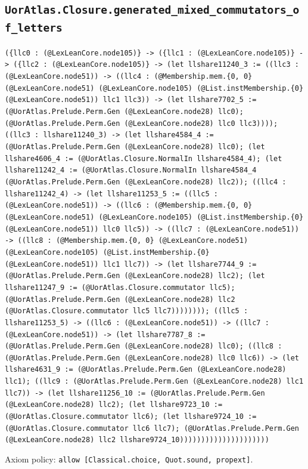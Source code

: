 \documentclass[11pt]{article}
\begin{document}
\subsection*{\texttt{UorAtlas.Closure.generated\_mixed\_commutators\_of\_letters}}
\noindent\texttt{(\{llc0 : (@LexLeanCore.node105)\} -> (\{llc1 : (@LexLeanCore.node105)\} -> (\{llc2 : (@LexLeanCore.node105)\} -> (let llshare11240\_3 := ((llc3 : (@LexLeanCore.node51)) -> ((llc4 : (@Membership.mem.\{0, 0\} (@LexLeanCore.node51) (@LexLeanCore.node105) (@List.instMembership.\{0\} (@LexLeanCore.node51)) llc1 llc3)) -> (let llshare7702\_5 := (@UorAtlas.Prelude.Perm.Gen (@LexLeanCore.node28) llc0); (@UorAtlas.Prelude.Perm.Gen (@LexLeanCore.node28) llc0 llc3)))); ((llc3 : llshare11240\_3) -> (let llshare4584\_4 := (@UorAtlas.Prelude.Perm.Gen (@LexLeanCore.node28) llc0); (let llshare4606\_4 := (@UorAtlas.Closure.NormalIn llshare4584\_4); (let llshare11242\_4 := (@UorAtlas.Closure.NormalIn llshare4584\_4 (@UorAtlas.Prelude.Perm.Gen (@LexLeanCore.node28) llc2)); ((llc4 : llshare11242\_4) -> (let llshare11253\_5 := ((llc5 : (@LexLeanCore.node51)) -> ((llc6 : (@Membership.mem.\{0, 0\} (@LexLeanCore.node51) (@LexLeanCore.node105) (@List.instMembership.\{0\} (@LexLeanCore.node51)) llc0 llc5)) -> ((llc7 : (@LexLeanCore.node51)) -> ((llc8 : (@Membership.mem.\{0, 0\} (@LexLeanCore.node51) (@LexLeanCore.node105) (@List.instMembership.\{0\} (@LexLeanCore.node51)) llc1 llc7)) -> (let llshare7744\_9 := (@UorAtlas.Prelude.Perm.Gen (@LexLeanCore.node28) llc2); (let llshare11247\_9 := (@UorAtlas.Closure.commutator llc5); (@UorAtlas.Prelude.Perm.Gen (@LexLeanCore.node28) llc2 (@UorAtlas.Closure.commutator llc5 llc7)))))))); ((llc5 : llshare11253\_5) -> ((llc6 : (@LexLeanCore.node51)) -> ((llc7 : (@LexLeanCore.node51)) -> (let llshare7787\_8 := (@UorAtlas.Prelude.Perm.Gen (@LexLeanCore.node28) llc0); ((llc8 : (@UorAtlas.Prelude.Perm.Gen (@LexLeanCore.node28) llc0 llc6)) -> (let llshare4631\_9 := (@UorAtlas.Prelude.Perm.Gen (@LexLeanCore.node28) llc1); ((llc9 : (@UorAtlas.Prelude.Perm.Gen (@LexLeanCore.node28) llc1 llc7)) -> (let llshare11256\_10 := (@UorAtlas.Prelude.Perm.Gen (@LexLeanCore.node28) llc2); (let llshare9723\_10 := (@UorAtlas.Closure.commutator llc6); (let llshare9724\_10 := (@UorAtlas.Closure.commutator llc6 llc7); (@UorAtlas.Prelude.Perm.Gen (@LexLeanCore.node28) llc2 llshare9724\_10)))))))))))))))))))))}\par
\noindent Axiom policy: \texttt{allow [Classical.choice, Quot.sound, propext]}.\par
\end{document}
